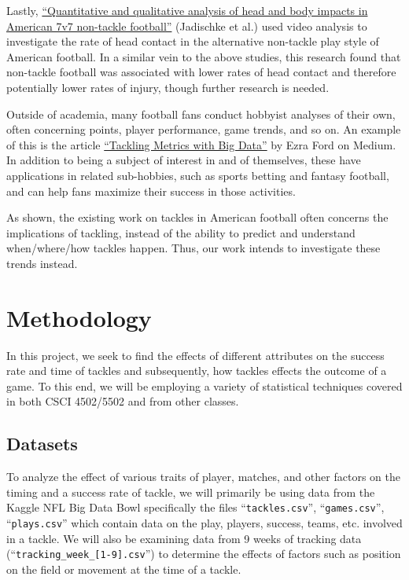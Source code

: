 \documentclass[bibtex, sigconf, hyperref={colorlinks=true,linkcolor=blue,urlcolor=blue}]{acmart}
\begin{document}
Lastly,
\href{https://bmjopensem.bmj.com/content/6/1/e000638.abstract}{“Quantitative and
qualitative analysis of head and body impacts in American 7v7 non-tackle
football”}\cite{quantitative} (Jadischke et al.) used video analysis to
investigate the rate of head contact in the alternative non-tackle play style of
American football. In a similar vein to the above studies, this research found
that non-tackle football was associated with lower rates of head contact and
therefore potentially lower rates of injury, though further research is needed.

Outside of academia, many football fans conduct hobbyist analyses of their own,
often concerning points, player performance, game trends, and so on. An example
of this is the article
\href{https://medium.com/@ezra.ford/tackling-metrics-with-big-data-0812b5ab65f0}{“Tackling
Metrics with Big Data”}\cite{mediummetrics} by Ezra Ford on Medium. In addition to being a subject
of interest in and of themselves, these have applications in related
sub-hobbies, such as sports betting and fantasy football, and can help fans
maximize their success in those activities.

As shown, the existing work on tackles in American football often concerns the
implications of tackling, instead of the ability to predict and understand
when/where/how tackles happen.  Thus, our work intends to investigate these
trends instead.

\section{Methodology}

In this project, we seek to find the effects of different attributes on the
success rate and time of tackles and subsequently, how tackles effects the
outcome of a game.  To this end, we will be employing a variety of statistical
techniques covered in both CSCI 4502/5502 and from other classes.

\subsection{Datasets}

To analyze the effect of various traits of player, matches, and other factors on
the timing and a success rate of tackle, we will primarily be using data from
the Kaggle NFL Big Data Bowl \cite{nflkaggle}
specifically the files ``\verb|tackles.csv|'', ``\verb|games.csv|'',
``\verb|plays.csv|'' which contain data on the play, players, success, teams,
etc. involved in a tackle.  We will also be examining data from 9 weeks of
tracking data (``\verb|tracking_week_[1-9].csv|'') to determine the effects of
factors such as position on the field or movement at the time of a tackle.
\end{document}
